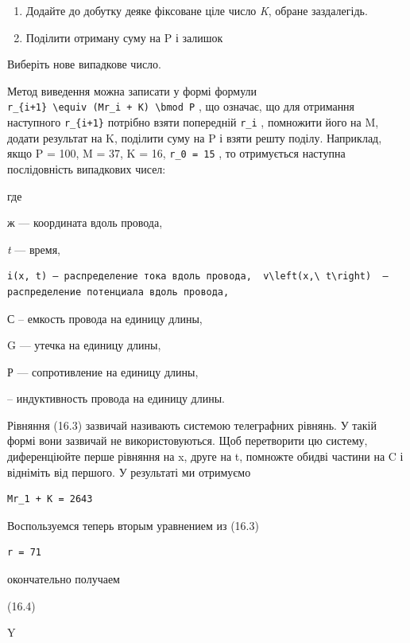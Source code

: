 \documentclass[
  ukrainian,
]{article}
\begin{document}
\begin{enumerate}
\def\labelenumi{\arabic{enumi}.}
\setcounter{enumi}{2}
\item
  Додайте до добутку деяке фіксоване ціле число \emph{K}, обране
  заздалегідь.
\item
  Поділити отриману суму на P і залишок
\end{enumerate}

Виберіть нове випадкове число.

Метод виведення можна записати у формі формули
\texttt{r\_\{i+1\}\ \textbackslash{}equiv\ (Mr\_i\ +\ K)\ \textbackslash{}bmod\ P}
, що означає, що для отримання наступного \texttt{r\_\{i+1\}} потрібно
взяти попередній \texttt{r\_i} , помножити його на M, додати результат
на K, поділити суму на P і взяти решту поділу. Наприклад, якщо P = 100,
M = 37, K = 16, \texttt{r\_0\ =\ 15} , то отримується наступна
послідовність випадкових чисел:

где

ж --- координата вдоль провода,

\emph{t} --- время,

\begin{verbatim}
i(x, t) — распределение тока вдоль провода,  v\left(x,\ t\right)  — распределение потенциала вдоль провода,
\end{verbatim}

С -- емкость провода на единицу длины,

G --- утечка на единицу длины,

Р --- сопротивление на единицу длины,

-- индуктивность провода на единицу длины.

Рівняння (16.3) зазвичай називають системою телеграфних рівнянь. У такій
формі вони зазвичай не використовуються. Щоб перетворити цю систему,
диференціюйте перше рівняння на x, друге на t, помножте обидві частини
на C і відніміть від першого. У результаті ми отримуємо

\begin{verbatim}
Mr_1 + K = 2643
\end{verbatim}

Воспользуемся теперь вторым уравнением из (16.3)

\begin{verbatim}
r = 71
\end{verbatim}

окончательно получаем

(16.4)

Y
\end{document}
